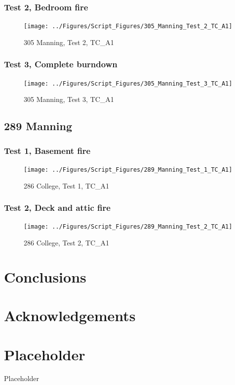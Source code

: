 \documentclass[11pt,oneside]{book}
\begin{document}
\subsection{Test 2, Bedroom fire}

\begin{figure}[!ht]
\texttt{[image: ../Figures/Script\_Figures/305\_Manning\_Test\_2\_TC\_A1]}
\caption{305 Manning, Test 2, TC\_A1}
\label{fig:305_Manning_Test_2_TC_A1}
\end{figure}

\subsection{Test 3, Complete burndown}

\begin{figure}[!ht]
\texttt{[image: ../Figures/Script\_Figures/305\_Manning\_Test\_3\_TC\_A1]}
\caption{305 Manning, Test 3, TC\_A1}
\label{fig:305_Manning_Test_3_TC_A1}
\end{figure}

\clearpage


\section{289 Manning}

\subsection{Test 1, Basement fire}

\begin{figure}[!ht]
\texttt{[image: ../Figures/Script\_Figures/289\_Manning\_Test\_1\_TC\_A1]}
\caption{286 College, Test 1, TC\_A1}
\label{fig:289_Manning_Test_1_TC_A1}
\end{figure}

\subsection{Test 2, Deck and attic fire}

\begin{figure}[!ht]
\texttt{[image: ../Figures/Script\_Figures/289\_Manning\_Test\_2\_TC\_A1]}
\caption{286 College, Test 2, TC\_A1}
\label{fig:289_Manning_Test_2_TC_A1}
\end{figure}


\clearpage


\chapter{Conclusions}
\label{chap:Conclusions}

\chapter{Acknowledgements}
\label{chap:Acknowledgements}



\appendix

\chapter{Placeholder}

Placeholder
\end{document}
